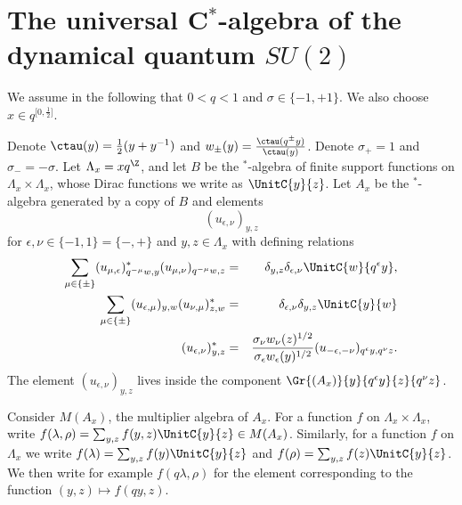 



\section{The universal C$^*$-algebra of the dynamical quantum $SU(2)$}\label{SecUni}

We assume in the following that $0<q<1$ and $\sigma \in \{-1,+1\}$. We also choose $x\in q^{\lbrack 0,\frac{1}{2}\rbrack}$.

Denote $\ctau(y) = \frac{1}{2}(y+y^{-1})$ and $w_{\pm}(y) = \frac{\ctau(q^{\pm}y)}{\ctau(y)}$. Denote $\sigma_+ = 1$ and $\sigma_- = -\sigma$. Let $\Lambda_x = xq^{\Z}$, and let $B$ be the $^*$-algebra of finite support functions on $\Lambda_x\times \Lambda_x$, whose Dirac functions we write as $\UnitC{y}{z}$. Let $A_x$ be the $^*$-algebra generated by a copy of $B$ and elements \[(u_{\epsilon,\nu})_{y,z}\] for $\epsilon,\nu\in \{-1,1\}=\{-,+\}$ and $y,z\in \Lambda_x$ with defining relations \begin{eqnarray*} \sum_{\mu\in \{\pm\}} (u_{\mu,\epsilon})_{q^{-\mu}w,y}^* (u_{\mu,\nu})_{q^{-\mu}w,z}&=& \delta_{y,z} \delta_{\epsilon,\nu} \UnitC{w}{q^{\epsilon}y},\\ \sum_{\mu\in \{\pm\}} (u_{\epsilon,\mu})_{y,w} (u_{\nu,\mu})_{z,w}^* &=& \delta_{\epsilon,\nu}\delta_{y,z} \UnitC{y}{w} \\ (u_{\epsilon,\nu})_{y,z}^* &=& \frac{\sigma_{\nu}w_{\nu}(z)^{1/2}}{\sigma_{\epsilon}w_{\epsilon}(y)^{1/2}} (u_{-\epsilon,-\nu})_{q^{\epsilon}y,q^{\nu}z}.\end{eqnarray*} The element $(u_{\epsilon,\nu})_{y,z}$ lives inside the component $\Gr{(A_x)}{y}{q^{\epsilon}y}{z}{q^{\nu}z}$.

Consider $M(A_x)$, the multiplier algebra of $A_x$. For a function $f$ on $\Lambda_x\times \Lambda_x$, write $f(\lambda,\rho) = \sum_{y,z} f(y,z)\UnitC{y}{z} \in M(A_x)$. Similarly, for a function $f$ on $\Lambda_x$ we write $f(\lambda) = \sum_{y,z} f(y)\UnitC{y}{z}$ and $f(\rho) = \sum_{y,z}f(z)\UnitC{y}{z}$. We then write for example $f(q\lambda,\rho)$ for the element corresponding to the function $(y,z)\mapsto f(qy,z)$.


